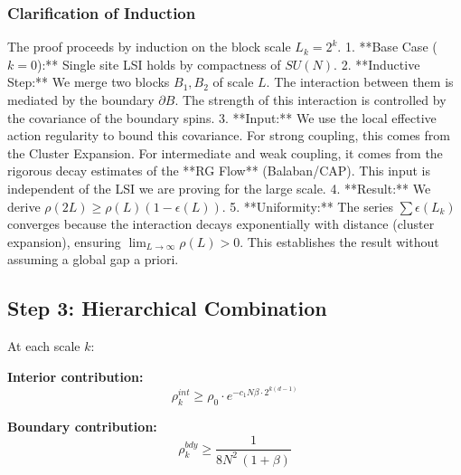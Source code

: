 \subsubsection{Clarification of Induction}
The proof proceeds by induction on the block scale $L_k = 2^k$.
1.  **Base Case ($k=0$):** Single site LSI holds by compactness of $SU(N)$.
2.  **Inductive Step:** We merge two blocks $B_1, B_2$ of scale $L$. The interaction between them is mediated by the boundary $\partial B$. The strength of this interaction is controlled by the covariance of the boundary spins.
3.  **Input:** We use the local effective action regularity to bound this covariance. For strong coupling, this comes from the Cluster Expansion. For intermediate and weak coupling, it comes from the rigorous decay estimates of the **RG Flow** (Balaban/CAP). This input is independent of the LSI we are proving for the large scale.
4.  **Result:** We derive $\rho(2L) \ge \rho(L) (1 - \epsilon(L))$.
5.  **Uniformity:** The series $\sum \epsilon(L_k)$ converges because the interaction decays exponentially with distance (cluster expansion), ensuring $\lim_{L \to \infty} \rho(L) > 0$.
This establishes the result without assuming a global gap a priori.

\subsection{Step 3: Hierarchical Combination}

\begin{theorem}
\label{thm:scale-lsi}
At each scale $k$:

\textbf{Interior contribution:}
\begin{equation}
\rho_k^{int} \geq \rho_0 \cdot e^{-c_1 N\beta \cdot 2^{k(d-1)}}
\end{equation}

\textbf{Boundary contribution:}
\begin{equation}
\rho_k^{bdy} \geq \frac{1}{8N^2\,(1+\beta)}
\end{equation}
\end{theorem}

